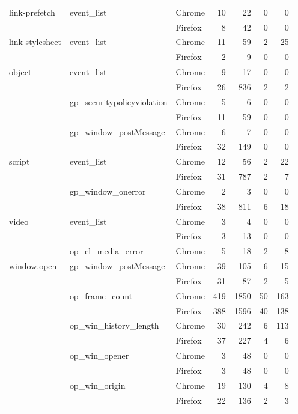 \begin{tabular}{lllrrrr}
link-prefetch & event\_list & Chrome &     10 &    22 &         0 &        0 \\
            &               & Firefox &      8 &    42 &         0 &        0 \\
link-stylesheet & event\_list & Chrome &     11 &    59 &         2 &       25 \\
            &               & Firefox &      2 &     9 &         0 &        0 \\
object & event\_list & Chrome &      9 &    17 &         0 &        0 \\
            &               & Firefox &     26 &   836 &         2 &        2 \\
            & gp\_securitypolicyviolation & Chrome &      5 &     6 &         0 &        0 \\
            &               & Firefox &     11 &    59 &         0 &        0 \\
            & gp\_window\_postMessage & Chrome &      6 &     7 &         0 &        0 \\
            &               & Firefox &     32 &   149 &         0 &        0 \\
script & event\_list & Chrome &     12 &    56 &         2 &       22 \\
            &               & Firefox &     31 &   787 &         2 &        7 \\
            & gp\_window\_onerror & Chrome &      2 &     3 &         0 &        0 \\
            &               & Firefox &     38 &   811 &         6 &       18 \\
video & event\_list & Chrome &      3 &     4 &         0 &        0 \\
            &               & Firefox &      3 &    13 &         0 &        0 \\
            & op\_el\_media\_error & Chrome &      5 &    18 &         2 &        8 \\
window.open & gp\_window\_postMessage & Chrome &     39 &   105 &         6 &       15 \\
            &               & Firefox &     31 &    87 &         2 &        5 \\
            & op\_frame\_count & Chrome &    419 &  1850 &        50 &      163 \\
            &               & Firefox &    388 &  1596 &        40 &      138 \\
            & op\_win\_history\_length & Chrome &     30 &   242 &         6 &      113 \\
            &               & Firefox &     37 &   227 &         4 &        6 \\
            & op\_win\_opener & Chrome &      3 &    48 &         0 &        0 \\
            &               & Firefox &      3 &    48 &         0 &        0 \\
            & op\_win\_origin & Chrome &     19 &   130 &         4 &        8 \\
            &               & Firefox &     22 &   136 &         2 &        3 \\
\bottomrule
\end{tabular}
